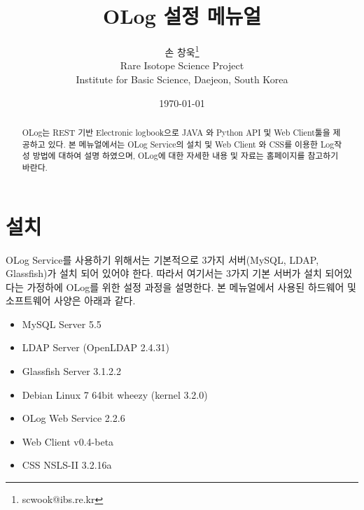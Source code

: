 \documentclass[11pt
  , a4paper
  , article
  , oneside
]{memoir}
\begin{document}
\newcommand{\technumber}{
  RAON Control-Document Series\\
  Revision : v1.0,   Release : June 24, 2014}
\title{\textbf{OLog 설정 메뉴얼}}

\author{손 창욱\thanks{scwook@ibs.re.kr} \\

  Rare Isotope Science Project\\
  Institute for Basic Science, Daejeon, South Korea
}
\date{\today}

\renewcommand{\maketitlehooka}{\begin{flushright}\textsf{\technumber}\end{flushright}}

\maketitle

\begin{abstract}
OLog는 REST 기반 Electronic logbook으로 JAVA 와 Python API 및 Web Client툴을 제공하고 있다.
본 메뉴얼에서는 OLog Service의 설치 및 Web Client 와 CSS를 이용한 Log작성 방법에 대하여 설명 하였으며,
OLog에 대한 자세한 내용 및 자료는 홈페이지를\citep{OLOG_HOME} 참고하기 바란다.
\end{abstract}

\chapter{설치}
OLog Service를 사용하기 위해서는 기본적으로 3가지 서버(MySQL, LDAP, Glassfish)가 설치 되어 
있어야 한다. 따라서 여기서는 3가지 기본 서버가 설치 되어있다는 가정하에 OLog를 위한 설정 과정을
설명한다. 본 메뉴얼에서 사용된 하드웨어 및 소프트웨어 사양은 아래과 같다.

\begin{itemize}
\item MySQL Server 5.5
\item LDAP Server (OpenLDAP 2.4.31)
\item Glassfish Server 3.1.2.2
\item Debian Linux 7 64bit wheezy (kernel 3.2.0)
\item OLog Web Service 2.2.6\citep{OLOG_DN}
\item Web Client v0.4-beta\citep{OLOG_DN}
\item CSS NSLS-II 3.2.16a\citep{CSS_HOME}
\end{itemize}
\end{document}
